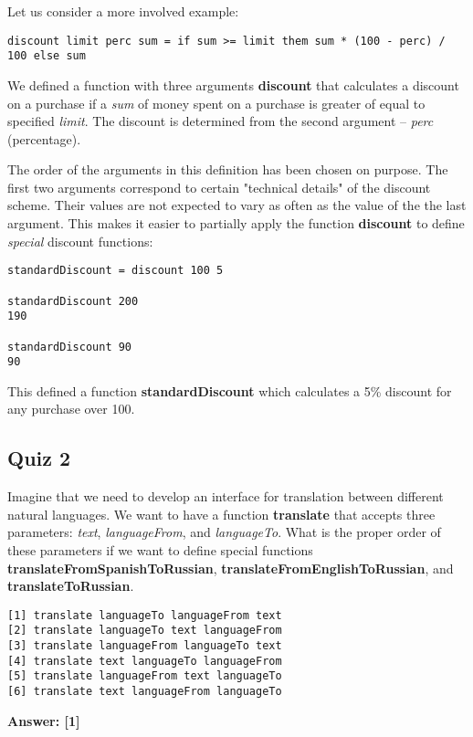 \documentclass[11pt]{article}
\begin{document}
Let us consider a more involved example:
\begin{verbatim}
discount limit perc sum = if sum >= limit them sum * (100 - perc) / 100 else sum
\end{verbatim}
We defined a function with three arguments \textbf{discount} that
calculates a discount on a purchase if a \emph{sum} of money spent on a
purchase is greater of equal to specified \emph{limit}. The discount is
determined from the second argument -- \emph{perc} (percentage).

The order of the arguments in this definition has been chosen on
purpose. The first two arguments correspond to certain "technical
details" of the discount scheme. Their values are not expected to
vary as often as the value of the the last argument. This makes it
easier to partially apply the function \textbf{discount} to define
\emph{special} discount functions:
\begin{verbatim}
standardDiscount = discount 100 5

standardDiscount 200
190

standardDiscount 90
90
\end{verbatim}
This defined a function \textbf{standardDiscount} which calculates a 5\%
discount for any purchase over 100.


\subsection{Quiz 2}
\label{sec:orgfd4c3e1}
Imagine that we need to develop an interface for translation between
different natural languages. We want to have a function \textbf{translate}
that accepts three parameters: \emph{text},  \emph{languageFrom},  and
\emph{languageTo}. What is the proper order of these parameters if we
want to define special functions \textbf{translateFromSpanishToRussian},
\textbf{translateFromEnglishToRussian}, and \textbf{translateToRussian}.
\begin{verbatim}
[1] translate languageTo languageFrom text
[2] translate languageTo text languageFrom
[3] translate languageFrom languageTo text
[4] translate text languageTo languageFrom
[5] translate languageFrom text languageTo
[6] translate text languageFrom languageTo
\end{verbatim}

\textbf{Answer: [1]}
\end{document}
